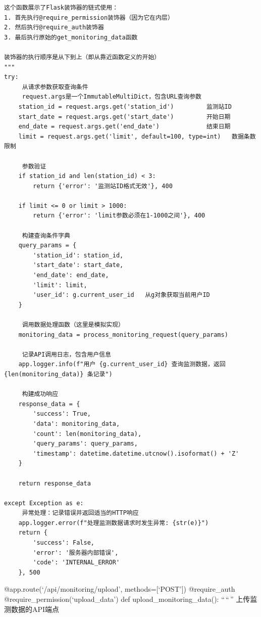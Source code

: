 \begin{verbatim}
这个函数展示了Flask装饰器的链式使用：
1. 首先执行@require_permission装饰器（因为它在内层）
2. 然后执行@require_auth装饰器
3. 最后执行原始的get_monitoring_data函数

装饰器的执行顺序是从下到上（即从靠近函数定义的开始）
"""
try:
     从请求参数获取查询条件
     request.args是一个ImmutableMultiDict，包含URL查询参数
    station_id = request.args.get('station_id')         监测站ID
    start_date = request.args.get('start_date')         开始日期
    end_date = request.args.get('end_date')             结束日期
    limit = request.args.get('limit', default=100, type=int)   数据条数限制
    
     参数验证
    if station_id and len(station_id) < 3:
        return {'error': '监测站ID格式无效'}, 400
    
    if limit <= 0 or limit > 1000:
        return {'error': 'limit参数必须在1-1000之间'}, 400
    
     构建查询条件字典
    query_params = {
        'station_id': station_id,
        'start_date': start_date,
        'end_date': end_date,
        'limit': limit,
        'user_id': g.current_user_id   从g对象获取当前用户ID
    }
    
     调用数据处理函数（这里是模拟实现）
    monitoring_data = process_monitoring_request(query_params)
    
     记录API调用日志，包含用户信息
    app.logger.info(f"用户 {g.current_user_id} 查询监测数据，返回 {len(monitoring_data)} 条记录")
    
     构建成功响应
    response_data = {
        'success': True,
        'data': monitoring_data,
        'count': len(monitoring_data),
        'query_params': query_params,
        'timestamp': datetime.datetime.utcnow().isoformat() + 'Z'
    }
    
    return response_data
    
except Exception as e:
     异常处理：记录错误并返回适当的HTTP响应
    app.logger.error(f"处理监测数据请求时发生异常: {str(e)}")
    return {
        'success': False,
        'error': '服务器内部错误',
        'code': 'INTERNAL_ERROR'
    }, 500
\end{verbatim}

@app.route(`/api/monitoring/upload', methods={[}`POST'{]}) @require\_auth @require\_permission(`upload\_data') def upload\_monitoring\_data(): ``\,``\,'' 上传监测数据的API端点

